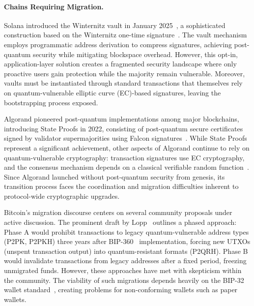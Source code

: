 \paragraph{Chains Requiring Migration.} Solana introduced the Winternitz vault in January 2025~\cite{ref_solana_vault}, a sophisticated construction based on the Winternitz one-time signature~\cite{AFRICACRYPT:BDEHR11}. The vault mechanism employs programmatic address derivation to compress signatures, achieving post-quantum security while mitigating blockspace overhead. However, this opt-in, application-layer solution creates a fragmented security landscape where only proactive users gain protection while the majority remain vulnerable. Moreover, vaults must be instantiated through standard transactions that themselves rely on quantum-vulnerable elliptic curve (EC)-based signatures, leaving the bootstrapping process exposed.

Algorand pioneered post-quantum implementations among major blockchains, introducing State Proofs in 2022, consisting of post-quantum secure certificates signed by validator supermajorities using Falcon signatures~\cite{ref_algorand_stateproofs,ref_gpv}. While State Proofs represent a significant achievement, other aspects of Algorand continue to rely on quantum-vulnerable cryptography: transaction signatures use EC cryptography, and the consensus mechanism depends on a classical verifiable random function~\cite{ref_algorand_roadmap}. Since Algorand launched without post-quantum security from genesis, its transition process faces the coordination and migration difficulties inherent to protocol-wide cryptographic upgrades.

Bitcoin's migration discourse centers on several community proposals under active discussion. The prominent draft by Lopp~\cite{ref_lopp_migration} outlines a phased approach: Phase A would prohibit transactions to legacy quantum-vulnerable address types (P2PK, P2PKH) three years after BIP-360~\cite{ref_bip360} implementation, forcing new UTXOs (unspent transaction output) into quantum-resistant formats (P2QRH). Phase B would invalidate transactions from legacy addresses after a fixed period, freezing unmigrated funds. However, these approaches have met with skepticism within the community. The viability of such migrations depends heavily on the BIP-32 wallet standard~\cite{BIP32}, creating problems for non-conforming wallets such as paper wallets.

